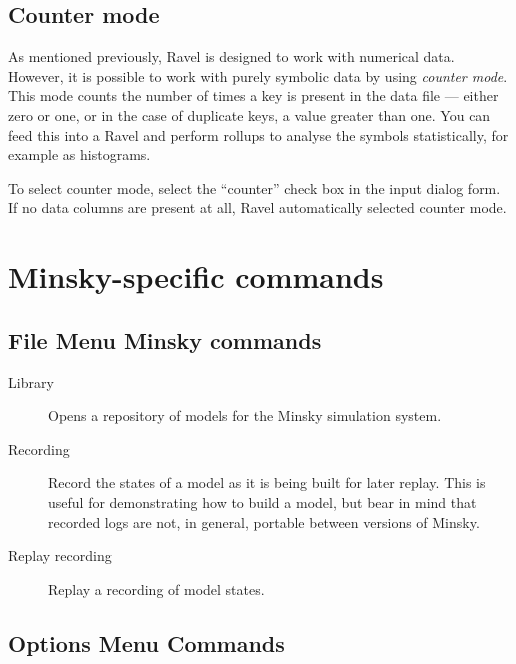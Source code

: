 \subsection{Counter mode}
\label{counter}

As mentioned previously, Ravel is designed to work with numerical
data. However, it is possible to work with purely symbolic data by
using {\em counter mode}. This mode counts the
number of times a key is present in the data file --- either zero or
one, or in the case of duplicate keys, a value greater than one. You
can feed this into a Ravel and perform rollups to analyse the symbols
statistically, for example as histograms.

To select counter mode, select the ``counter'' check box in the input
dialog form. If no data columns are present at all, Ravel
automatically selected counter mode.

\section{Minsky-specific commands}

\subsection{File Menu Minsky commands}
\begin{description}
\item [{Library}] Opens a repository of models for the Minsky simulation
system.
\item [{Recording}] Record the states of a model as it is being built for
later replay. This is useful for demonstrating how to build a model,
but bear in mind that recorded logs are not, in general, portable
between versions of Minsky.
\item [{Replay recording}] Replay a recording of model states.
\end{description}

\subsection{Options Menu Commands}

